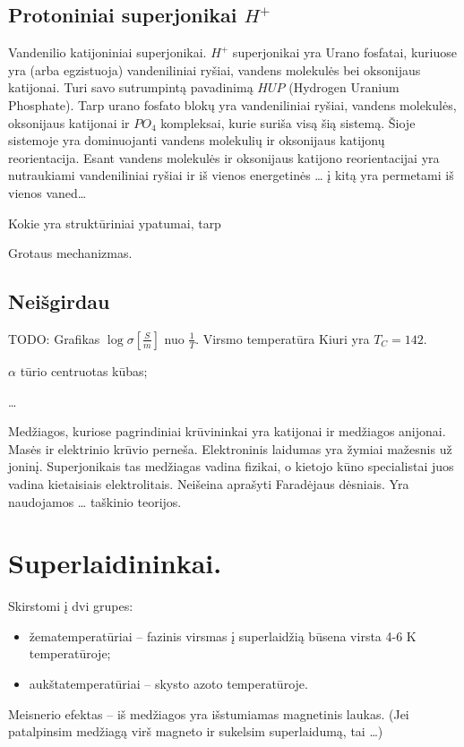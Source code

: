 \subsection{Protoniniai superjonikai $H^{+}$}

Vandenilio katijoniniai superjonikai. $H^{+}$ superjonikai yra
Urano fosfatai, kuriuose yra (arba egzistuoja) vandeniliniai ryšiai,
vandens molekulės bei oksonijaus katijonai. Turi savo sutrumpintą
pavadinimą $HUP$ (Hydrogen Uranium Phosphate). Tarp urano fosfato
blokų yra vandeniliniai ryšiai, vandens molekulės, oksonijaus
katijonai ir $PO_{4}$ kompleksai, kurie suriša visą šią sistemą.
Šioje sistemoje yra dominuojanti vandens molekulių ir oksonijaus
katijonų reorientacija. Esant vandens molekulės ir oksonijaus
katijono reorientacijai yra nutraukiami vandeniliniai ryšiai ir 
iš vienos energetinės … į kitą yra permetami iš vienos vaned…

\begin{remember}
  \item Kokie yra struktūriniai ypatumai, tarp 
  \item Grotaus mechanizmas.

\end{remember}

\subsection{Neišgirdau}

TODO: Grafikas $\log \sigma [\frac{S}{m}]$ nuo $\frac{1}{T}$.
Virsmo temperatūra Kiuri yra $T_{C} = 142$.

\begin{remember}
  \item $\alpha$ tūrio centruotas kūbas;
  \item …
\end{remember}


Medžiagos, kuriose pagrindiniai krūvininkai yra katijonai ir medžiagos
anijonai. Masės ir elektrinio krūvio perneša. Elektroninis laidumas yra
žymiai mažesnis už joninį. Superjonikais tas medžiagas vadina fizikai,
o kietojo kūno specialistai juos vadina kietaisiais elektrolitais.
Neišeina aprašyti Faradėjaus dėsniais. Yra naudojamos … taškinio teorijos.
\section{Superlaidininkai.}
Skirstomi į dvi grupes:
\begin{itemize}
  \item žematemperatūriai – fazinis virsmas į superlaidžią būsena virsta
    4-6 K temperatūroje;
  \item aukštatemperatūriai – skysto azoto temperatūroje.
\end{itemize}
Meisnerio efektas – iš medžiagos yra išstumiamas magnetinis laukas.
(Jei patalpinsim medžiagą virš magneto ir sukelsim superlaidumą,
tai …)
